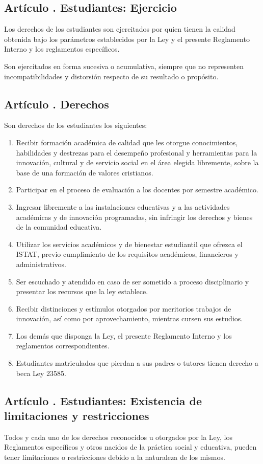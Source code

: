 \subsection{Artículo . Estudiantes: Ejercicio}
\addtocounter{ns}{1}
Los derechos de los estudiantes son ejercitados por quien tienen la calidad obtenida bajo los parámetros establecidos por la Ley y el presente Reglamento Interno y los reglamentos específicos. 

Son ejercitados en forma sucesiva o acumulativa, siempre que no representen incompatibilidades y distorsión respecto de su resultado o propósito. 
\subsection{Artículo . Derechos}
\addtocounter{ns}{1}
Son derechos de los estudiantes los siguientes:
\begin{enumerate}
\item Recibir formación académica de calidad que les otorgue conocimientos, habilidades y destrezas para el desempeño profesional y herramientas para la innovación, cultural y de servicio social en el área elegida libremente, sobre la base de una formación de valores cristianos. 
\item Participar en el proceso de evaluación a los docentes por semestre académico. 
\item Ingresar libremente a las instalaciones educativas y a las actividades académicas y de innovación programadas, sin infringir los derechos y bienes de la comunidad educativa. 
\item Utilizar los servicios académicos y de bienestar estudiantil que ofrezca el ISTAT, previo cumplimiento de los requisitos académicos, financieros y administrativos. 
\item Ser escuchado y atendido en caso de ser sometido a proceso disciplinario y presentar los recursos que la ley establece. 
\item Recibir distinciones y estímulos otorgados por meritorios trabajos de innovación, así como por aprovechamiento, mientras cursen sus estudios. 
\item Los demás que disponga la Ley, el presente Reglamento Interno y los reglamentos correspondientes. 
\item Estudiantes matriculados que pierdan a sus padres o tutores tienen derecho a beca Ley 23585.
\end{enumerate}
\subsection{Artículo . Estudiantes: Existencia de limitaciones y restricciones}
\addtocounter{ns}{1}
Todos y cada uno de los derechos reconocidos u otorgados por la Ley, los Reglamentos específicos y otros nacidos de la práctica social y educativa, pueden tener limitaciones o restricciones debido a la naturaleza de los mismos.  
